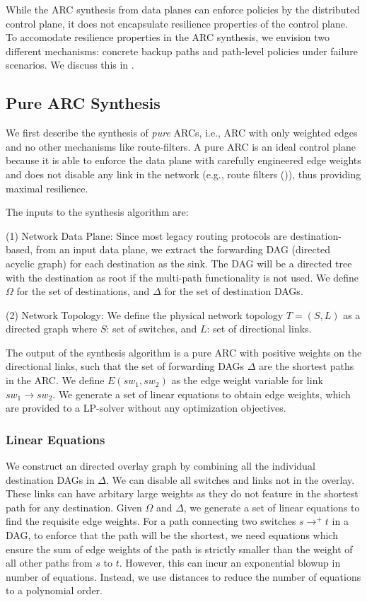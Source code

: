While the ARC synthesis from data planes can enforce 
policies by the distributed control plane, it does not
encapsulate resilience properties of the control plane. 
To accomodate resilience properties in the ARC synthesis,
we envision two different mechanisms: concrete
backup paths and path-level policies under failure scenarios. 
We discuss this in . 

\subsection{Pure ARC Synthesis}
We first describe the synthesis of {\em pure} ARCs, i.e., 
ARC with only weighted edges and no other mechanisms like route-filters.
A pure ARC is an ideal control plane because it is able to
enforce the data plane with carefully engineered edge weights
and does not disable any link in the network (e.g., route filters
()), thus providing maximal resilience. 

The inputs to the synthesis algorithm are:

(1) Network Data Plane:
Since most legacy routing protocols are destination-based,
from an input data plane, we extract the forwarding
DAG (directed acyclic graph) for each destination
as the sink. The DAG will be a directed tree with the
destination as root if the multi-path
functionality is not used. We define $\Omega$ for the 
set of destinations, and $\Delta$ for  
the set of destination DAGs. 

(2) Network Topology: 
We define the physical network topology $T = (S, L)$
as a directed graph where $S$: set of switches, and 
$L$: set of directional links. 

The output of the synthesis algorithm is a 
pure ARC with positive weights on the directional links,
such that the set of forwarding DAGs $\Delta$ are the 
shortest paths in the ARC. We define $E(sw_1, sw_2)$ as
the edge weight variable for link $sw_1 \rightarrow sw_2$. 
We generate a set of linear equations to obtain edge weights,
which are provided to a LP-solver without any optimization
objectives. 

\subsubsection{Linear Equations}
We construct an directed overlay graph
by combining all the individual destination DAGs in $\Delta$.
We can disable all switches and links not in the overlay. 
These links can have arbitary large weights as they do not
feature in the shortest path for any destination. 
Given $\Omega$ and $\Delta$, we generate a set of linear equations
to find the requisite edge weights. For a path connecting two switches 
$s \rightarrow^+ t$ in a DAG, 
to enforce that the path will be the shortest, we need equations
which ensure the sum of edge weights of the path is strictly smaller than
the weight of all other paths from $s$ to $t$. However, this can incur
an exponential blowup in number of equations. Instead, we use distances 
to reduce the number of equations to a polynomial order. 

